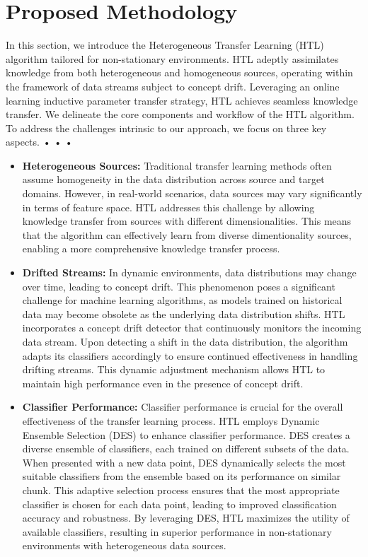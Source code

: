 \section{Proposed Methodology}\label{sec:4_first_proposed_approach}

In this section, we introduce the Heterogeneous Transfer Learning (HTL) algorithm tailored for non-stationary environments. HTL adeptly assimilates knowledge from both heterogeneous and homogeneous sources, operating within the framework of data streams subject to concept drift. Leveraging an online learning inductive parameter transfer strategy, HTL achieves seamless knowledge transfer. We delineate the core components and workflow of the HTL algorithm. To address the challenges intrinsic to our approach, we focus on three key aspects.
•	
•	
•	

\begin{itemize}
	\item \textbf{Heterogeneous Sources:} Traditional transfer learning methods often assume homogeneity in the data distribution across source and target domains. However, in real-world scenarios, data sources may vary significantly in terms of feature space. HTL addresses this challenge by allowing knowledge transfer from sources with different dimensionalities. This means that the algorithm can effectively learn from diverse dimentionality sources, enabling a more comprehensive knowledge transfer process.
	\item \textbf{Drifted Streams:} In dynamic environments, data distributions may change over time, leading to concept drift. This phenomenon poses a significant challenge for machine learning algorithms, as models trained on historical data may become obsolete as the underlying data distribution shifts. HTL incorporates a concept drift detector that continuously monitors the incoming data stream. Upon detecting a shift in the data distribution, the algorithm adapts its classifiers accordingly to ensure continued effectiveness in handling drifting streams. This dynamic adjustment mechanism allows HTL to maintain high performance even in the presence of concept drift.
	\item \textbf{Classifier Performance:} Classifier performance is crucial for the overall effectiveness of the transfer learning process. HTL employs Dynamic Ensemble Selection (DES) to enhance classifier performance. DES creates a diverse ensemble of classifiers, each trained on different subsets of the data. When presented with a new data point, DES dynamically selects the most suitable classifiers from the ensemble based on its performance on similar chunk. This adaptive selection process ensures that the most appropriate classifier is chosen for each data point, leading to improved classification accuracy and robustness. By leveraging DES, HTL maximizes the utility of available classifiers, resulting in superior performance in non-stationary environments with heterogeneous data sources.
\end{itemize}

